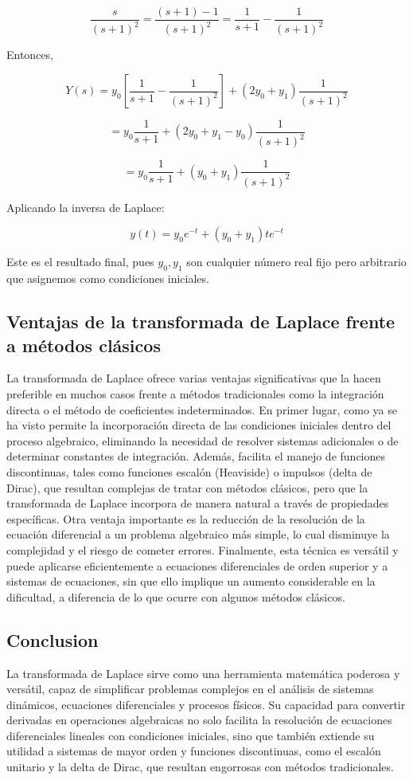 \documentclass{article}
\theoremstyle{nonumberplain}
\begin{document}
\[
\frac{s}{(s+1)^2} = \frac{(s+1)-1}{(s+1)^2} = \frac{1}{s+1} - \frac{1}{(s+1)^2}
\]

Entonces,

\[
Y(s) = y_0 \left[ \frac{1}{s+1} - \frac{1}{(s+1)^2} \right] + (2y_0 + y_1) \frac{1}{(s+1)^2}
\]

\[
= y_0 \frac{1}{s+1} + (2y_0 + y_1 - y_0) \frac{1}{(s+1)^2}
\]

\[
= y_0 \frac{1}{s+1} + (y_0 + y_1) \frac{1}{(s+1)^2}
\]

Aplicando la inversa de Laplace:

\[
y(t) = y_0 e^{-t} + (y_0 + y_1) t e^{-t}
\]

Este es el resultado final, pues $y_0, y_1$ son cualquier número real fijo pero arbitrario que asignemos como condiciones iniciales.

\subsection{Ventajas de la transformada de Laplace frente a métodos clásicos}

La transformada de Laplace ofrece varias ventajas significativas que la hacen preferible en muchos casos frente a métodos tradicionales como la integración directa o el método de coeficientes indeterminados. En primer lugar, como ya se ha visto permite la incorporación directa de las condiciones iniciales dentro del proceso algebraico, eliminando la necesidad de resolver sistemas adicionales o de determinar constantes de integración. Además, facilita el manejo de funciones discontinuas, tales como funciones escalón (Heaviside) o impulsos (delta de Dirac), que resultan complejas de tratar con métodos clásicos, pero que la transformada de Laplace incorpora de manera natural a través de propiedades específicas. Otra ventaja importante es la reducción de la resolución de la ecuación diferencial a un problema algebraico más simple, lo cual disminuye la complejidad y el riesgo de cometer errores. Finalmente, esta técnica es versátil y puede aplicarse eficientemente a ecuaciones diferenciales de orden superior y a sistemas de ecuaciones, sin que ello implique un aumento considerable en la dificultad, a diferencia de lo que ocurre con algunos métodos clásicos.

\subsection*{Conclusion}
La transformada de Laplace sirve como una herramienta matemática poderosa y versátil, capaz de simplificar problemas complejos en el análisis de sistemas dinámicos, ecuaciones diferenciales y procesos físicos. Su capacidad para convertir derivadas en operaciones algebraicas no solo facilita la resolución de ecuaciones diferenciales lineales con condiciones iniciales, sino que también extiende su utilidad a sistemas de mayor orden y funciones discontinuas, como el escalón unitario y la delta de Dirac, que resultan engorrosas con métodos tradicionales.
\end{document}
